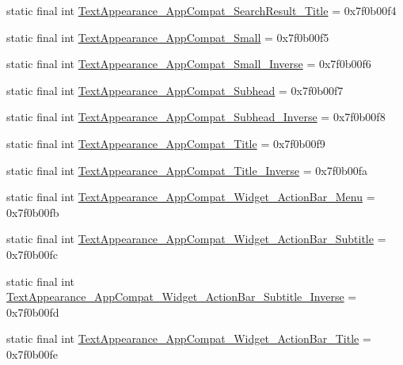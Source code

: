 \begin{CompactItemize}
\item 
static final int \hyperlink{classandroid_1_1support_1_1graphics_1_1drawable_1_1_r_1_1style_b4c499b53e854834816dcbbf39b0f4f7}{TextAppearance\_\-AppCompat\_\-SearchResult\_\-Title} = 0x7f0b00f4
\item 
static final int \hyperlink{classandroid_1_1support_1_1graphics_1_1drawable_1_1_r_1_1style_662b9bfabdf746a3eba1a0ff990f9583}{TextAppearance\_\-AppCompat\_\-Small} = 0x7f0b00f5
\item 
static final int \hyperlink{classandroid_1_1support_1_1graphics_1_1drawable_1_1_r_1_1style_a6ad07785c94f39ce01f96df0d6b9c79}{TextAppearance\_\-AppCompat\_\-Small\_\-Inverse} = 0x7f0b00f6
\item 
static final int \hyperlink{classandroid_1_1support_1_1graphics_1_1drawable_1_1_r_1_1style_44100850c4a769b45136aa23c6423c27}{TextAppearance\_\-AppCompat\_\-Subhead} = 0x7f0b00f7
\item 
static final int \hyperlink{classandroid_1_1support_1_1graphics_1_1drawable_1_1_r_1_1style_68b738e30127e682a8a1b55283303ce0}{TextAppearance\_\-AppCompat\_\-Subhead\_\-Inverse} = 0x7f0b00f8
\item 
static final int \hyperlink{classandroid_1_1support_1_1graphics_1_1drawable_1_1_r_1_1style_54f960c735b976b3e0e10a6f45257704}{TextAppearance\_\-AppCompat\_\-Title} = 0x7f0b00f9
\item 
static final int \hyperlink{classandroid_1_1support_1_1graphics_1_1drawable_1_1_r_1_1style_e2499df7af2f489730d5a4610a6e881e}{TextAppearance\_\-AppCompat\_\-Title\_\-Inverse} = 0x7f0b00fa
\item 
static final int \hyperlink{classandroid_1_1support_1_1graphics_1_1drawable_1_1_r_1_1style_49adb89daa1ff6c5254164f04c014142}{TextAppearance\_\-AppCompat\_\-Widget\_\-ActionBar\_\-Menu} = 0x7f0b00fb
\item 
static final int \hyperlink{classandroid_1_1support_1_1graphics_1_1drawable_1_1_r_1_1style_c2485ef76840fb7c5c3fd8336fa5b001}{TextAppearance\_\-AppCompat\_\-Widget\_\-ActionBar\_\-Subtitle} = 0x7f0b00fc
\item 
static final int \hyperlink{classandroid_1_1support_1_1graphics_1_1drawable_1_1_r_1_1style_2593a8e4fd9ecfe084cb2d066c9cdd5c}{TextAppearance\_\-AppCompat\_\-Widget\_\-ActionBar\_\-Subtitle\_\-Inverse} = 0x7f0b00fd
\item 
static final int \hyperlink{classandroid_1_1support_1_1graphics_1_1drawable_1_1_r_1_1style_bcb2dd2e012be3f829572fa75ec7ca6e}{TextAppearance\_\-AppCompat\_\-Widget\_\-ActionBar\_\-Title} = 0x7f0b00fe

\end{CompactItemize}
